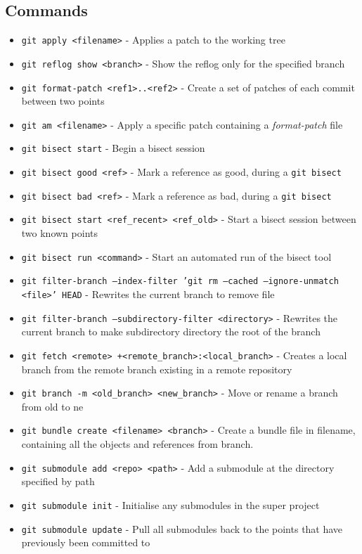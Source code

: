 \subsection{Commands}
\begin{itemize}
\item\texttt{git apply <filename>} - Applies a patch to the working tree
\item\texttt{git reflog show <branch>} - Show the reflog only for the specified branch
\item\texttt{git format-patch <ref1>..<ref2>} - Create a set of patches of each commit between two points
\item\texttt{git am <filename>} - Apply a specific patch containing a \emph{format-patch} file
\item\texttt{git bisect start} - Begin a bisect session
\item\texttt{git bisect good <ref>} - Mark a reference as good, during a \texttt{git bisect}
\item\texttt{git bisect bad <ref>} - Mark a reference as bad, during a \texttt{git bisect}
\item\texttt{git bisect start <ref\_recent> <ref\_old>} - Start a bisect session between two known points
\item\texttt{git bisect run <command>} - Start an automated run of the bisect tool
\item\texttt{git filter-branch --index-filter 'git rm --cached \newline --ignore-unmatch <file>' HEAD} - Rewrites the current branch to remove file
\item\texttt{git filter-branch --subdirectory-filter <directory>} - Rewrites the current branch to make subdirectory directory the root of the branch
\item\texttt{git fetch <remote> +<remote\_branch>:<local\_branch>} - Creates a local branch from the remote branch existing in a remote repository
\item\texttt{git branch -m <old\_branch> <new\_branch>} - Move or rename a branch from old to ne
\item\texttt{git bundle create <filename> <branch>} - Create a bundle file in filename, containing all the objects and references from branch. 
\item\texttt{git submodule add <repo> <path>} - Add a submodule at the directory specified by path
\item\texttt{git submodule init} - Initialise any submodules in the super project
\item\texttt{git submodule update} - Pull all submodules back to the points that have previously been committed to
\end{itemize}

